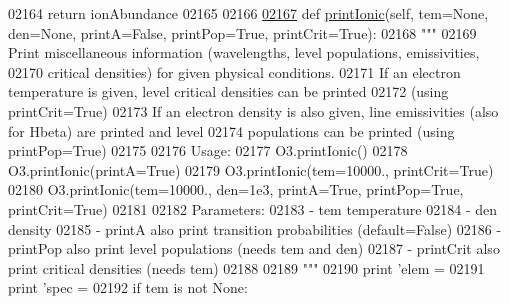 \begin{DoxyCode}
{{02164         \textcolor{keywordflow}{return} ionAbundance
02165     
02166 
\hypertarget{pynebcore_8py_source_l02167}{}\hyperlink{classpyneb_1_1core_1_1pynebcore_1_1_atom_a4be768ed1460bb448207b470551ef2ed}{02167}     \textcolor{keyword}{def }\hyperlink{classpyneb_1_1core_1_1pynebcore_1_1_atom_a4be768ed1460bb448207b470551ef2ed}{printIonic}(self, tem=None, den=None, printA=False, printPop=True, printCrit=True):
02168         \textcolor{stringliteral}{""" }
02169 \textcolor{stringliteral}{        Print miscellaneous information (wavelengths, level populations, emissivities, }
02170 \textcolor{stringliteral}{            critical densities) for given physical conditions.}
02171 \textcolor{stringliteral}{        If an electron temperature is given, level critical densities can be printed }
02172 \textcolor{stringliteral}{            (using printCrit=True)}
02173 \textcolor{stringliteral}{        If an electron density is also given, line emissivities (also for Hbeta) are printed and level }
02174 \textcolor{stringliteral}{            populations can be printed (using printPop=True)}
02175 \textcolor{stringliteral}{        }
02176 \textcolor{stringliteral}{        Usage:}
02177 \textcolor{stringliteral}{            O3.printIonic()}
02178 \textcolor{stringliteral}{            O3.printIonic(printA=True)}
02179 \textcolor{stringliteral}{            O3.printIonic(tem=10000., printCrit=True)}
02180 \textcolor{stringliteral}{            O3.printIonic(tem=10000., den=1e3, printA=True, printPop=True, printCrit=True)}
02181 \textcolor{stringliteral}{}
02182 \textcolor{stringliteral}{        Parameters:}
02183 \textcolor{stringliteral}{            - tem          temperature}
02184 \textcolor{stringliteral}{            - den          density}
02185 \textcolor{stringliteral}{            - printA       also print transition probabilities (default=False)}
02186 \textcolor{stringliteral}{            - printPop     also print level populations (needs tem and den)}
02187 \textcolor{stringliteral}{            - printCrit    also print critical densities (needs tem)}
02188 \textcolor{stringliteral}{}
02189 \textcolor{stringliteral}{        """}
02190         \textcolor{keywordflow}{print} \textcolor{stringliteral}{'elem = %
02191         \textcolor{keywordflow}{print} \textcolor{stringliteral}{'spec = %
02192         \textcolor{keywordflow}{if} tem \textcolor{keywordflow}{is} \textcolor{keywordflow}{not} \textcolor{keywordtype}{None}:
}}}}
\end{DoxyCode}
